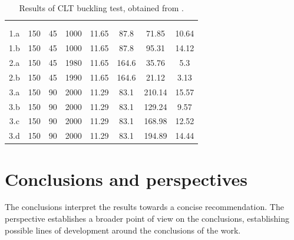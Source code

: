         \begin{table}[htbp]
            \centering
            \caption{Results of CLT buckling test, obtained from \textcite{pinaNumericalStudyElastic2019}.}
            \begin{tabular}{c
                            S[table-format=3.0]
                            S[table-format=2.0]
                            S[table-format=4.0]
                            S[table-format=2.2]
                            S[table-format=3.1]
                            S[table-format=3.2]
                            S[table-format=2.2]}
            \toprule
                {}
                    & {} 
                        & {}
                            & {}
                                & {}
                                    & {}
                                        & {}
                                            & {} \\
                &&&&&&&\\\midrule
            1.a   & 150   & 45    & 1000  & 11.65 & 87.8  & 71.85 & 10.64 \\
            1.b   & 150   & 45    & 1000  & 11.65 & 87.8  & 95.31 & 14.12 \\
            2.a   & 150   & 45    & 1980  & 11.65 & 164.6 & 35.76 & 5.3 \\
            2.b   & 150   & 45    & 1990  & 11.65 & 164.6 & 21.12 & 3.13 \\
            3.a   & 150   & 90    & 2000  & 11.29 & 83.1  & 210.14 & 15.57 \\
            3.b   & 150   & 90    & 2000  & 11.29 & 83.1  & 129.24 & 9.57 \\
            3.c   & 150   & 90    & 2000  & 11.29 & 83.1  & 168.98 & 12.52 \\
            3.d   & 150   & 90    & 2000  & 11.29 & 83.1  & 194.89 & 14.44 \\\bottomrule
            \end{tabular}%
            \label{tab:CLTresults}%
        \end{table}%

\section{Conclusions and perspectives}
    The conclusions interpret the results towards a concise recommendation. The perspective establishes a broader point of view on the conclusions, establishing possible lines of development around the conclusions of the work.